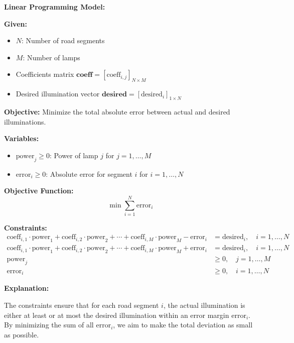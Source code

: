 \documentclass{article}
\begin{document}
\textbf{Linear Programming Model:}

\textbf{Given:}
\begin{itemize}
    \item \( N \): Number of road segments
    \item \( M \): Number of lamps
    \item Coefficients matrix \(\textbf{coeff} = [\text{coeff}_{i,j}]_{N \times M}\)
    \item Desired illumination vector \(\textbf{desired} = [\text{desired}_i]_{1 \times N}\)
\end{itemize}

\textbf{Objective:} Minimize the total absolute error between actual and desired illuminations.

\textbf{Variables:}
\begin{itemize}
    \item \(\text{power}_j \geq 0\): Power of lamp \(j\) for \(j = 1, \ldots, M\)
    \item \(\text{error}_i \geq 0\): Absolute error for segment \(i\) for \(i = 1, \ldots, N\)
\end{itemize}

\textbf{Objective Function:}
\[
\min \sum_{i=1}^{N} \text{error}_i
\]

\textbf{Constraints:}
\begin{align*}
\text{coeff}_{i,1} \cdot \text{power}_1 + \text{coeff}_{i,2} \cdot \text{power}_2 + \cdots + \text{coeff}_{i,M} \cdot \text{power}_M - \text{error}_i &= \text{desired}_i, \quad i = 1, \ldots, N \\
\text{coeff}_{i,1} \cdot \text{power}_1 + \text{coeff}_{i,2} \cdot \text{power}_2 + \cdots + \text{coeff}_{i,M} \cdot \text{power}_M + \text{error}_i &= \text{desired}_i, \quad i = 1, \ldots, N \\
\text{power}_j &\geq 0, \quad j = 1, \ldots, M \\
\text{error}_i &\geq 0, \quad i = 1, \ldots, N
\end{align*}

\textbf{Explanation:}

The constraints ensure that for each road segment \(i\), the actual illumination is either at least or at most the desired illumination within an error margin \(\text{error}_i\). By minimizing the sum of all \(\text{error}_i\), we aim to make the total deviation as small as possible.
\end{document}

